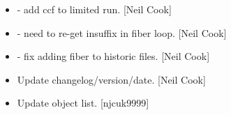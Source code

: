 \documentclass[a4paper,10pt,english]{report}
\begin{document}
\begin{itemize}
\item {} 
 - add ccf to limited
run. {[}Neil Cook{]}

\item {} 
 - need to re-get insuffix
in fiber loop. {[}Neil Cook{]}

\item {} 
 - fix adding fiber to historic files. {[}Neil
Cook{]}

\item {} 
Update changelog/version/date. {[}Neil Cook{]}

\item {} 
Update object list. {[}njcuk9999{]}

\end{itemize}
\end{document}
